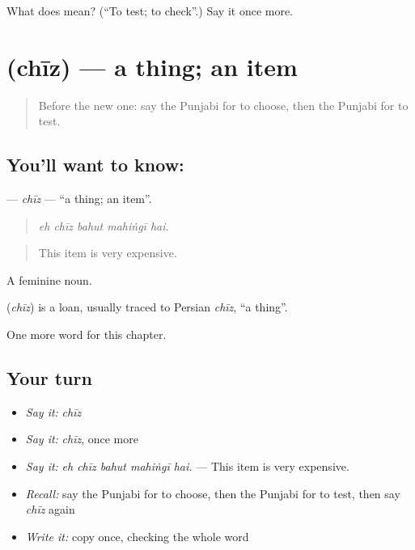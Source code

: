 \begin{tcolorbox}[breakable,colback=teal!4,colframe=teal!35!black,title={Before you move on}]
What does  mean? (\textquotedblleft{}To test; to check\textquotedblright{}.) Say it once more.
\end{tcolorbox}
\section[\texorpdfstring{\pa{ਚੀਜ਼} (chīz)}{ਚੀਜ਼ (chīz)}]{ (chīz) — a thing; an item}

\label{lesson:PA-C277-chiz}



\begin{quote}
Before the new one: say the Punjabi for to choose, then the Punjabi for to test.
\end{quote}

\subsection*{You'll want to know: }
\textbf{} — \emph{chīz} — \textquotedblleft{}a thing; an item\textquotedblright{}.

\begin{quote}
    
\end{quote}

\begin{quote}
\emph{eh chīz bahut mahiṅgī hai.}
\end{quote}

\begin{quote}
This item is very expensive.
\end{quote}

A feminine noun.

\begin{cousinweb}
\textbf{} (\emph{chīz}) is a loan, usually traced to Persian \emph{chīz}, \textquotedblleft{}a thing\textquotedblright{}.
\end{cousinweb}

\begin{grammarlens}[title={What you've built}]
One more word for this chapter.
\end{grammarlens}

\subsection*{Your turn}
\begin{itemize}
\raggedright
  \item \emph{Say it:} \emph{chīz}
  \item \emph{Say it:} \emph{chīz}, once more
  \item \emph{Say it:} \emph{eh chīz bahut mahiṅgī hai.} — This item is very expensive.
  \item \emph{Recall:} say the Punjabi for to choose, then the Punjabi for to test, then say \emph{chīz} again
  \item \emph{Write it:} copy \textbf{} once, checking the whole word
\end{itemize}

